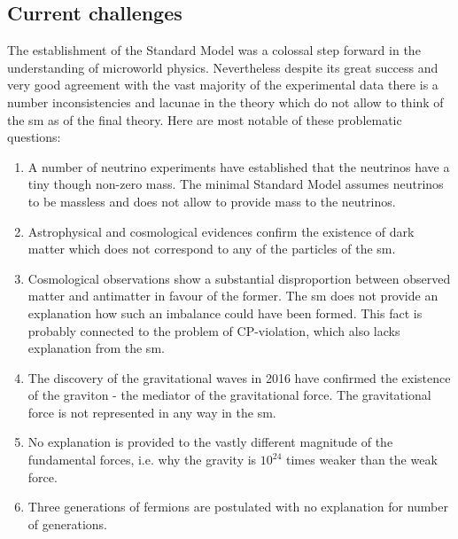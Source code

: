 \subsection{Current challenges}

The establishment of the Standard Model was a colossal step forward in the understanding of microworld physics. Nevertheless despite its great success and very good agreement with the vast majority of the experimental data there is a number inconsistencies and lacunae in the theory which do not allow to think of the \gls{sm} as of the final theory. Here are most notable of these problematic questions:
\begin{enumerate}
	\item A number of neutrino experiments have established that the neutrinos have a tiny though non-zero mass. The minimal Standard Model assumes neutrinos to be massless and does not allow to provide mass to the neutrinos. 
	\item Astrophysical and cosmological evidences confirm the existence of dark matter which does not correspond to any of the particles of the \gls{sm}. 
	\item Cosmological observations show a substantial disproportion between observed matter and antimatter in favour of the former. The \gls{sm} does not provide an explanation how such an imbalance could have been formed. This fact is probably connected to the problem of CP-violation, which also lacks explanation from the \gls{sm}.
	\item The discovery of the gravitational waves in 2016 have confirmed the existence of the graviton - the mediator of the gravitational force. The gravitational force is not represented in any way in the \gls{sm}.
	\item No explanation is provided to the vastly different magnitude of the fundamental forces, i.e. why the gravity is $10^{24}$ times weaker than the weak force. 
	\item Three generations of fermions are postulated with no explanation for number of generations. 
\end{enumerate}

